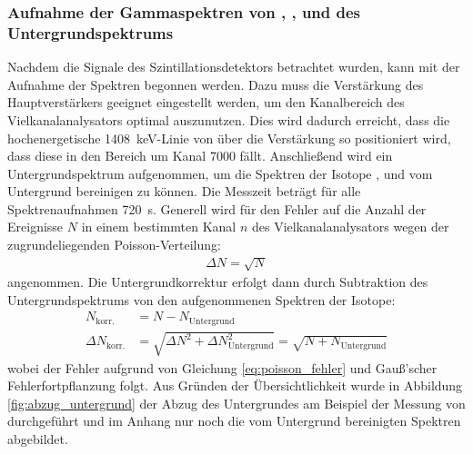 \documentclass[11pt, a4paper]{article}
\numberwithin{equation}{section}
\begin{document}
\subsubsection{Aufnahme der Gammaspektren von , ,  und des Untergrundspektrums}
Nachdem die Signale des Szintillationsdetektors betrachtet wurden, kann mit der Aufnahme der Spektren begonnen werden.
Dazu muss die Verstärkung des Hauptverstärkers geeignet eingestellt werden, um den Kanalbereich des Vielkanalanalysators optimal auszunutzen.
Dies wird dadurch erreicht, dass die hochenergetische \SI{1408}{keV}-Linie von  über die Verstärkung so positioniert wird, dass diese in den Bereich um Kanal 7000 fällt.
Anschließend wird ein Untergrundspektrum aufgenommen, um die Spektren der Isotope ,  und  vom Untergrund bereinigen zu können.
Die Messzeit beträgt für alle Spektrenaufnahmen \SI{720}{\second}.
Generell wird für den Fehler auf die Anzahl der Ereignisse $N$ in einem bestimmten Kanal $n$ des Vielkanalanalysators wegen der zugrundeliegenden Poisson-Verteilung:
\begin{align}
\label{eq:poisson_fehler}
\Delta N = \sqrt{N}
\end{align}
angenommen.
Die Untergrundkorrektur erfolgt dann durch Subtraktion des Untergrundspektrums von den aufgenommenen Spektren der Isotope:
\begin{align}
	\label{eq:untergrundkorr_fehler}
	N_\mathrm{korr.} &= N - N_\mathrm{Untergrund}  \nonumber\\
	\Delta N_\mathrm{korr.} &= \sqrt{\Delta N^2 + \Delta N_\mathrm{Untergrund}^2} = \sqrt{N + N_\mathrm{Untergrund}}
\end{align}
wobei der Fehler aufgrund von Gleichung \ref{eq:poisson_fehler} und Gauß'scher Fehlerfortpflanzung folgt.
Aus Gründen der Übersichtlichkeit wurde in Abbildung \ref{fig:abzug_untergrund} der Abzug des Untergrundes am Beispiel der Messung von  durchgeführt und im Anhang nur noch die vom Untergrund bereinigten Spektren abgebildet.
\end{document}
